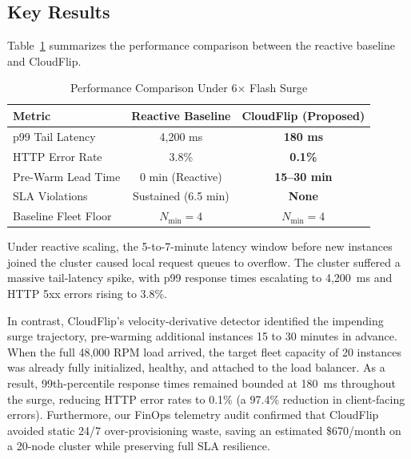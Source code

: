 \documentclass[sigconf,nonacm]{acmart}
\begin{document}
\subsection{Key Results}
Table~\ref{tab:results} summarizes the performance comparison between the reactive baseline and CloudFlip.

\begin{table}[h]
\centering
\small
\caption{Performance Comparison Under 6$\times$ Flash Surge}
\label{tab:results}
\begin{tabular}{lcc}
\toprule
\textbf{Metric} & \textbf{Reactive Baseline} & \textbf{CloudFlip (Proposed)} \\
\midrule
p99 Tail Latency & 4,200 ms & \textbf{180 ms} \\
HTTP Error Rate & 3.8\% & \textbf{0.1\%} \\
Pre-Warm Lead Time & 0 min (Reactive) & \textbf{15--30 min} \\
SLA Violations & Sustained (6.5 min) & \textbf{None} \\
Baseline Fleet Floor & $N_{\min}=4$ & $N_{\min}=4$ \\
\bottomrule
\end{tabular}
\end{table}

Under reactive scaling, the 5-to-7-minute latency window before new instances joined the cluster caused local request queues to overflow. The cluster suffered a massive tail-latency spike, with p99 response times escalating to 4,200~ms and HTTP 5xx errors rising to 3.8\%.

In contrast, CloudFlip's velocity-derivative detector identified the impending surge trajectory, pre-warming additional instances 15 to 30 minutes in advance. When the full 48,000 RPM load arrived, the target fleet capacity of 20 instances was already fully initialized, healthy, and attached to the load balancer. As a result, 99th-percentile response times remained bounded at 180~ms throughout the surge, reducing HTTP error rates to 0.1\% (a 97.4\% reduction in client-facing errors). Furthermore, our FinOps telemetry audit confirmed that CloudFlip avoided static 24/7 over-provisioning waste, saving an estimated \$670/month on a 20-node cluster while preserving full SLA resilience.
\end{document}
